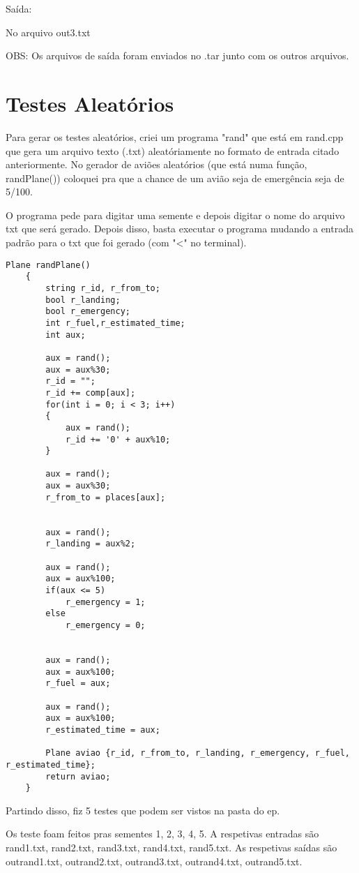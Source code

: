 \documentclass[a4paper,11pt]{article}
\theoremstyle{mytheor}
\begin{document}
Saída:\newline

No arquivo out3.txt\newline


OBS: Os arquivos de saída foram enviados no .tar junto com os outros arquivos.



\section*{Testes Aleatórios}

    Para gerar os testes aleatórios, criei um programa "rand" que está em rand.cpp que gera um arquivo texto (.txt) aleatóriamente no formato de entrada citado anteriormente. No gerador de aviões aleatórios (que está numa função, randPlane()) coloquei pra que a chance de um avião seja de emergência seja de 5/100.\newline

    O programa pede para digitar uma semente e depois digitar o nome do arquivo txt que será gerado. Depois disso, basta executar o programa mudando a entrada padrão para o txt que foi gerado (com "<" no terminal).

\begin{lstlisting}[label={list:first},caption= Parte do código em rand.cpp que gera aviões aleatórios.]
    Plane randPlane()
    {
        string r_id, r_from_to;
        bool r_landing;
        bool r_emergency;
        int r_fuel,r_estimated_time;
        int aux;
    
        aux = rand();
        aux = aux%30;
        r_id = "";
        r_id += comp[aux];
        for(int i = 0; i < 3; i++)
        {
            aux = rand();
            r_id += '0' + aux%10;
        } 
    
        aux = rand();
        aux = aux%30;
        r_from_to = places[aux];
    
    
        aux = rand();
        r_landing = aux%2;
    
        aux = rand();
        aux = aux%100;
        if(aux <= 5)
            r_emergency = 1;
        else
            r_emergency = 0;
    
        
        aux = rand();
        aux = aux%100;
        r_fuel = aux;
    
        aux = rand();
        aux = aux%100;
        r_estimated_time = aux;
    
        Plane aviao {r_id, r_from_to, r_landing, r_emergency, r_fuel, r_estimated_time};
        return aviao;
    } 
\end{lstlisting}


Partindo disso, fiz 5 testes que podem ser vistos na pasta do ep.\newline

Os teste foam feitos pras sementes 1, 2, 3, 4, 5. A respetivas entradas são rand1.txt, rand2.txt, rand3.txt, rand4.txt, rand5.txt. As respetivas saídas são outrand1.txt, outrand2.txt, outrand3.txt, outrand4.txt, outrand5.txt.\newline
\end{document}
